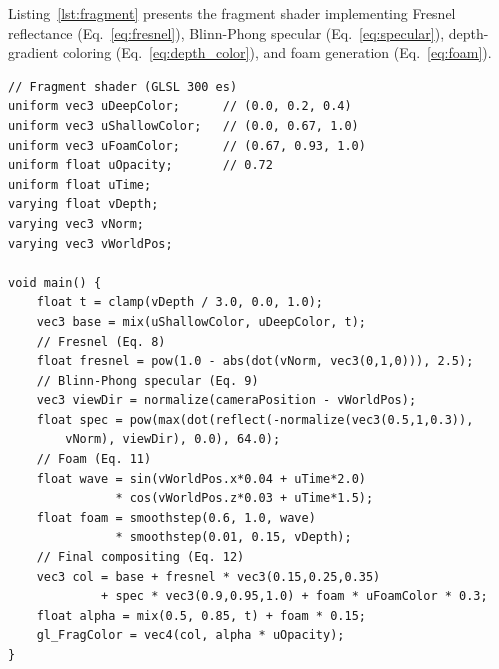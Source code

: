 \documentclass[11pt, a4paper]{article}
\begin{document}
Listing~\ref{lst:fragment} presents the fragment shader implementing Fresnel reflectance (Eq.~\ref{eq:fresnel}), Blinn-Phong specular (Eq.~\ref{eq:specular}), depth-gradient coloring (Eq.~\ref{eq:depth_color}), and foam generation (Eq.~\ref{eq:foam}).

\begin{verbatim}
// Fragment shader (GLSL 300 es)
uniform vec3 uDeepColor;      // (0.0, 0.2, 0.4)
uniform vec3 uShallowColor;   // (0.0, 0.67, 1.0)
uniform vec3 uFoamColor;      // (0.67, 0.93, 1.0)
uniform float uOpacity;       // 0.72
uniform float uTime;
varying float vDepth;
varying vec3 vNorm;
varying vec3 vWorldPos;

void main() {
    float t = clamp(vDepth / 3.0, 0.0, 1.0);
    vec3 base = mix(uShallowColor, uDeepColor, t);
    // Fresnel (Eq. 8)
    float fresnel = pow(1.0 - abs(dot(vNorm, vec3(0,1,0))), 2.5);
    // Blinn-Phong specular (Eq. 9)
    vec3 viewDir = normalize(cameraPosition - vWorldPos);
    float spec = pow(max(dot(reflect(-normalize(vec3(0.5,1,0.3)),
        vNorm), viewDir), 0.0), 64.0);
    // Foam (Eq. 11)
    float wave = sin(vWorldPos.x*0.04 + uTime*2.0)
               * cos(vWorldPos.z*0.03 + uTime*1.5);
    float foam = smoothstep(0.6, 1.0, wave)
               * smoothstep(0.01, 0.15, vDepth);
    // Final compositing (Eq. 12)
    vec3 col = base + fresnel * vec3(0.15,0.25,0.35)
             + spec * vec3(0.9,0.95,1.0) + foam * uFoamColor * 0.3;
    float alpha = mix(0.5, 0.85, t) + foam * 0.15;
    gl_FragColor = vec4(col, alpha * uOpacity);
}
\end{verbatim}
\end{document}
